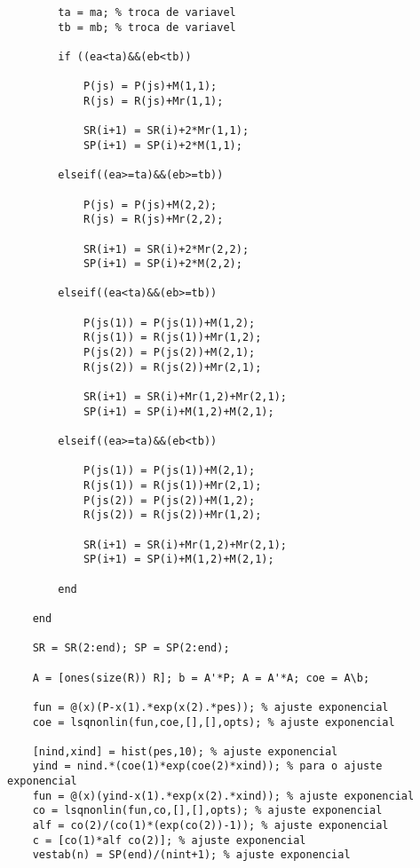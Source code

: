 {\begin{verbatim}
        ta = ma; % troca de variavel
        tb = mb; % troca de variavel
        
        if ((ea<ta)&&(eb<tb))
            
            P(js) = P(js)+M(1,1);
            R(js) = R(js)+Mr(1,1);
            
            SR(i+1) = SR(i)+2*Mr(1,1);
            SP(i+1) = SP(i)+2*M(1,1);
            
        elseif((ea>=ta)&&(eb>=tb))
            
            P(js) = P(js)+M(2,2);
            R(js) = R(js)+Mr(2,2);
            
            SR(i+1) = SR(i)+2*Mr(2,2);
            SP(i+1) = SP(i)+2*M(2,2);
            
        elseif((ea<ta)&&(eb>=tb))
            
            P(js(1)) = P(js(1))+M(1,2);
            R(js(1)) = R(js(1))+Mr(1,2);
            P(js(2)) = P(js(2))+M(2,1);
            R(js(2)) = R(js(2))+Mr(2,1);
            
            SR(i+1) = SR(i)+Mr(1,2)+Mr(2,1);
            SP(i+1) = SP(i)+M(1,2)+M(2,1);
            
        elseif((ea>=ta)&&(eb<tb))
            
            P(js(1)) = P(js(1))+M(2,1);
            R(js(1)) = R(js(1))+Mr(2,1);
            P(js(2)) = P(js(2))+M(1,2);
            R(js(2)) = R(js(2))+Mr(1,2);
            
            SR(i+1) = SR(i)+Mr(1,2)+Mr(2,1);
            SP(i+1) = SP(i)+M(1,2)+M(2,1);
            
        end
        
    end
    
    SR = SR(2:end); SP = SP(2:end);
    
    A = [ones(size(R)) R]; b = A'*P; A = A'*A; coe = A\b;
    
    fun = @(x)(P-x(1).*exp(x(2).*pes)); % ajuste exponencial
    coe = lsqnonlin(fun,coe,[],[],opts); % ajuste exponencial
    
    [nind,xind] = hist(pes,10); % ajuste exponencial
    yind = nind.*(coe(1)*exp(coe(2)*xind)); % para o ajuste exponencial
    fun = @(x)(yind-x(1).*exp(x(2).*xind)); % ajuste exponencial
    co = lsqnonlin(fun,co,[],[],opts); % ajuste exponencial
    alf = co(2)/(co(1)*(exp(co(2))-1)); % ajuste exponencial
    c = [co(1)*alf co(2)]; % ajuste exponencial
    vestab(n) = SP(end)/(nint+1); % ajuste exponencial
    

\end{verbatim}}

